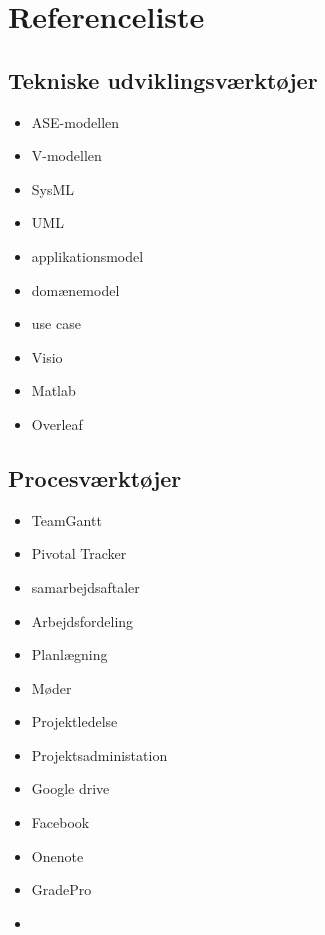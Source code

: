 \chapter{Referenceliste}





































\section*{Tekniske udviklingsværktøjer}
\begin{itemize}
\item ASE-modellen
\item V-modellen
\item SysML
\item UML
\item applikationsmodel
\item domænemodel
\item use case
\item Visio
\item Matlab
\item Overleaf

\end{itemize}






\section*{Procesværktøjer}
\begin{itemize}
\item TeamGantt
\item Pivotal Tracker
\item samarbejdsaftaler
\item Arbejdsfordeling
\item Planlægning
\item Møder
\item Projektledelse
\item Projektsadministation
\item Google drive
\item Facebook
\item Onenote
\item GradePro
\item 

\end{itemize}











